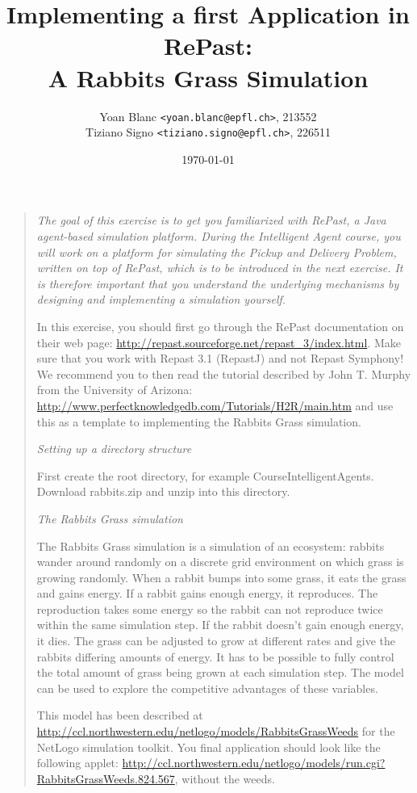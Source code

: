 \documentclass[11pt,a4paper]{article}
\title{\phantomsection%
    Implementing a first Application in RePast: \\
    A Rabbits Grass Simulation
}
\author{
    Yoan Blanc \texttt{<yoan.blanc@epfl.ch>}, 213552\\
    Tiziano Signo \texttt{<tiziano.signo@epfl.ch>}, 226511
}
\date{\today}
\begin{document}
\maketitle

\noindent
\begin{quote}{\it
    The goal of this exercise is to get you familiarized with \emph{RePast}, a Java
    agent-based simulation platform. During the Intelligent Agent course, you
    will work on a platform for simulating the Pickup and Delivery Problem,
    written on top of RePast, which is to be introduced in the next exercise.
    It is therefore important that you understand the underlying mechanisms by
    designing and implementing a simulation yourself.

    In this exercise, you should first go through the RePast documentation on
    their web page: \url{http://repast.sourceforge.net/repast_3/index.html}. Make
    sure that you work with Repast 3.1 (RepastJ) and not Repast Symphony! We
    recommend you to then read the tutorial described by John T. Murphy from
    the University of Arizona:
    \url{http://www.perfectknowledgedb.com/Tutorials/H2R/main.htm} and use this as a
    template to implementing the Rabbits Grass simulation.

    \medskip
    \emph{Setting up a directory structure}

    First create the root directory, for example CourseIntelligentAgents.
    Download rabbits.zip and unzip into this directory.

    \medskip
    \emph{The Rabbits Grass simulation}

    The Rabbits Grass simulation is a simulation of an ecosystem: rabbits
    wander around randomly on a discrete grid environment on which grass is
    growing randomly. When a rabbit bumps into some grass, it eats the grass
    and gains energy. If a rabbit gains enough energy, it reproduces. The
    reproduction takes some energy so the rabbit can not reproduce twice within
    the same simulation step. If the rabbit doesn't gain enough energy, it
    dies. The grass can be adjusted to grow at different rates and give the
    rabbits differing amounts of energy. It has to be possible to fully control
    the total amount of grass being grown at each simulation step. The model
    can be used to explore the competitive advantages of these variables.

    This model has been described at
    \url{http://ccl.northwestern.edu/netlogo/models/RabbitsGrassWeeds} for the
    NetLogo simulation toolkit. You final application should look like the
    following applet:
    \url{http://ccl.northwestern.edu/netlogo/models/run.cgi?RabbitsGrassWeeds.824.567},
    without the weeds.

}
\end{quote}
\end{document}
